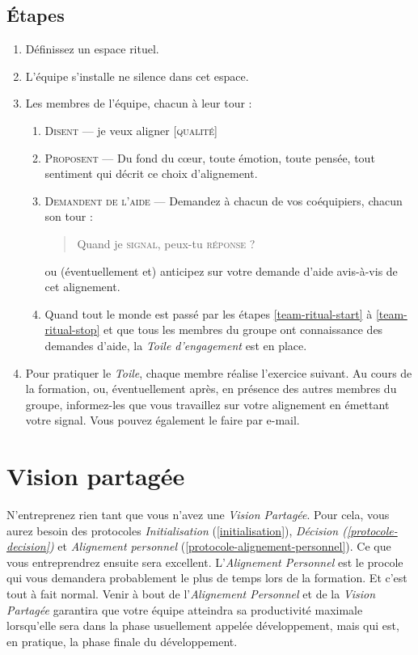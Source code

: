 \documentclass[11pt]{book}
\newcommand*{\numref}[1]{{\hyperref[{#1}]{\autoref*{#1}}}}
\let\oldsection\section
\renewcommand\section{\clearpage\oldsection}
\begin{document}
\subsection{Étapes}
\begin{enumerate}
	\item Définissez un espace rituel.
	\item L'équipe s'installe ne silence dans cet espace.
	\item Les membres de l'équipe, chacun à leur tour :
	      \begin{enumerate}
	      	\item \label{team-ritual-start} \textsc{Disent} --- \og{}je veux aligner [\textsc{qualité}]\fg{}
	      	\item \textsc{Proposent} --- Du fond du cœur, toute émotion, toute pensée, tout sentiment qui décrit ce choix d'alignement.
	      	\item \label{team-ritual-stop} \textsc{Demandent de l'aide} --- Demandez à chacun de vos coéquipiers, chacun son tour :
	      	      \begin{quote}
	      	      	\og{}Quand je \textsc{signal}, peux-tu \textsc{réponse} ?\fg{}
	      	      \end{quote}
	      	      ou (éventuellement et) anticipez sur votre demande d'aide avis-à-vis de cet alignement.
			\item Quand tout le monde est passé par les étapes \ref{team-ritual-start} à \ref{team-ritual-stop} et que tous les membres 
			      du groupe ont connaissance des demandes d'aide, la \emph{Toile d'engagement} est en place.
	      \end{enumerate}
	\item Pour pratiquer le \emph{Toile}, chaque membre réalise l'exercice suivant. Au cours de la formation, ou, éventuellement après,
	      en présence des autres membres du groupe, informez-les que vous travaillez sur votre alignement en émettant votre signal. 
	      Vous pouvez également le faire par e-mail.
\end{enumerate}

\section{Vision partagée} \label{vision-partagee}

N'entreprenez rien tant que vous n'avez une \emph{Vision Partagée}. Pour cela, vous aurez besoin des protocoles \emph{Initialisation}
(\numref{initialisation}), \emph{Décision (\numref{protocole-decision})} et \emph{Alignement personnel} (\numref{protocole-alignement-personnel}).
Ce que vous entreprendrez ensuite sera excellent. L'\emph{Alignement Personnel} est le procole qui vous demandera probablement le plus de 
temps lors de la formation. Et c'est tout à fait normal. Venir à bout de l'\emph{Alignement Personnel} et de la \emph{Vision Partagée} 
garantira que votre équipe atteindra sa productivité maximale lorsqu'elle sera dans la phase usuellement appelée \og{}développement\fg{},
mais qui est, en pratique, la phase finale du développement.
\end{document}
